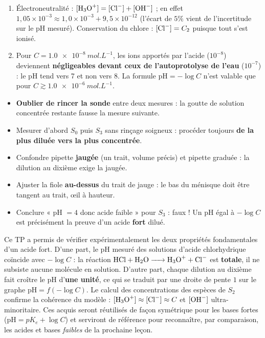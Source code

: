 \documentclass[11pt]{article}
\newcounter{popsec}
\newcounter{popsub}
\newcommand{\courssub}[1]{%
  \stepcounter{popsub}%
  \par\vspace{9pt}\noindent{\popxbold\fontsize{11.5}{13}\selectfont\color{popink}{\color{poporange}\thepopsec.\thepopsub}\hspace{6pt}#1}\par\nopagebreak\vspace{4pt}
}
\begin{document}
\begin{exoresolu}
\begin{enumerate}
\begin{align*}
\end{align*}
\item Électroneutralité : $[\ce{H3O+}] = [\ce{Cl-}] + [\ce{OH-}]$ ; en effet $1,05\times 10^{-3} \approx 1,0\times 10^{-3} + 9,5\times 10^{-12}$ (l'écart de $5\%$ vient de l'incertitude sur le pH mesuré). Conservation du chlore : $[\ce{Cl-}] = C_2$ puisque tout  s'est ionisé.
\item Pour $C = \SI{1,0e-8}{mol.L^{-1}}$, les ions  apportés par l'acide ($10^{-8}$) deviennent \textbf{négligeables devant ceux de l'autoprotolyse de l'eau} ($10^{-7}$) : le pH tend vers 7 et non vers 8. La formule $\text{pH} = -\log C$ n'est valable que pour $C \gtrsim \SI{1,0e-6}{mol.L^{-1}}$.
\end{enumerate}
\end{exoresolu}

\begin{attention}
\begin{itemize}
\item \textbf{Oublier de rincer la sonde} entre deux mesures : la goutte de solution concentrée restante fausse la mesure suivante.
\item Mesurer d'abord $S_0$ puis $S_3$ sans rinçage soigneux : procéder toujours \textbf{de la plus diluée vers la plus concentrée}.
\item Confondre pipette \textbf{jaugée} (un trait, volume précis) et pipette graduée : la dilution au dixième exige la jaugée.
\item Ajuster la fiole \textbf{au-dessus} du trait de jauge : le bas du ménisque doit être tangent au trait, œil à hauteur.
\item Conclure « pH $= 4$ donc acide faible » pour $S_3$ : faux ! Un pH égal à $-\log C$ est précisément la preuve d'un acide \textbf{fort} dilué.
\end{itemize}
\end{attention}

\courssub{Conclusion}

Ce TP a permis de vérifier expérimentalement les deux propriétés fondamentales d'un acide fort. D'une part, le pH mesuré des solutions d'acide chlorhydrique coïncide avec $-\log C$ : la réaction $\ce{HCl + H2O -> H3O+ + Cl-}$ est \textbf{totale}, il ne subsiste aucune molécule  en solution. D'autre part, chaque dilution au dixième fait croître le pH d'\textbf{une unité}, ce qui se traduit par une droite de pente $1$ sur le graphe $\text{pH} = f(-\log C)$. Le calcul des concentrations des espèces de $S_2$ confirme la cohérence du modèle : $[\ce{H3O+}] \approx [\ce{Cl-}] \approx C$ et $[\ce{OH-}]$ ultra-minoritaire. Ces acquis seront réutilisés de façon symétrique pour les bases fortes ($\text{pH} = pK_e + \log C$) et serviront de référence pour reconnaître, par comparaison, les acides et bases \emph{faibles} de la prochaine leçon.
\end{document}
